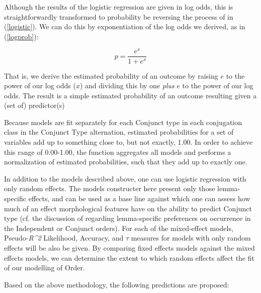 Although the results of the logistic regression are given in log odds, this is straightforwardly transformed to probability be reversing the process of in (\ref{logistic}). We can do this by exponentiation of the log odds we derived, as in (\ref{logprob}):

\begin{equation}
p = \frac{e^{x}}{1+e^{x}}
\label{logprob}
\end{equation}

That is, we derive the estimated probability of an outcome by raising $e$ to the power of our log odds ($x$) and dividing this by one \textit{plus} $e$ to the power of our log odds. The result is a simple estimated probability of an outcome resulting given a (set of) predictor(s)

 Because models are fit separately for each Conjunct type in each conjugation class in the Conjunct Type alternation, estimated probabilities for a set of variables add up to something close to, but not exactly, 1.00. In order to achieve this range of 0.00-1.00, the  function \citep{polytomous} aggregates all models and performs a normalization of estimated probabilities, such that they add up to exactly one.

In addition to the models described above, one can use logistic regression with only random effects. The models constructer here present only those lemma-specific effects, and can be used as a base line against which one can assess how much of an effect morphological features have on the ability to predict Conjunct type (cf. the discussion of \citet{HarriganArppe2015} regarding lemma-specific preferences on occurrence in the Independent or Conjunct orders). For each of the mixed-effect models, Pseudo-\textit{R^{2}} Likelihood, Accuracy, and $\tau$ measures for models with only random effects will be also be given. By comparing fixed effects models against the mixed effects models, we can determine the extent to which random effects affect the fit of our modelling of Order.

Based on the above methodology, the following predictions are proposed:

